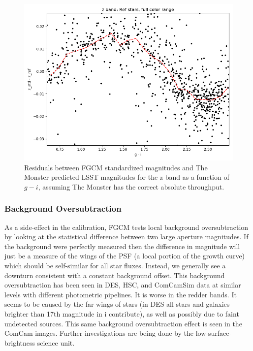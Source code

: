 \begin{figure}
  \includegraphics{photometric_calibration_figures/reference_residuals_z.png}
  \caption{Residuals between FGCM standardized magnitudes and The Monster
    predicted LSST magnitudes for the z band as a function of $g-i$, assuming
    The Monster has the correct absolute throughput.}
\end{figure}

\subsubsection{Background Oversubtraction}

As a side-effect in the calibration, FGCM tests local background
oversubtraction by looking at the statistical difference between two large
aperture magnitudes.  If the background were perfectly measured then the
difference in magnitude will just be a measure of the wings of the PSF (a local
portion of the growth curve) which should be self-similar for all star fluxes.
Instead, we generally see a downturn consistent with a constant background
offset.  This background oversubtraction has been seen in DES, HSC, and
ComCamSim data at similar levels with different photometric pipelines.  It is
worse in the redder bands.  It seems to be caused by the far wings of stars (in
DES all stars and galaxies brighter than 17th magnitude in i contribute), as
well as possibly due to faint undetected sources.  This same background
oversubtraction effect is seen in the ComCam images.  Further investigations
are being done by the low-surface-brightness science unit.

